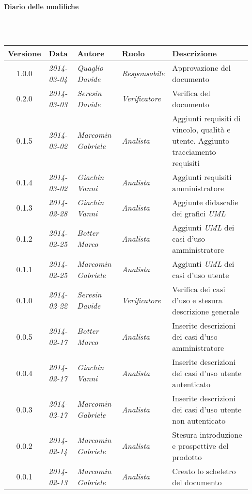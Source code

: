 \noindent\begin{Large}\textbf{Diario delle modifiche}\end{Large}\\
\\
\begin{small}
\begin{tabular}{|c|p{1.8cm}|p{2.8cm}|p{2.8cm}|p{3.5cm}|}
\hline
Versione & Data & Autore & Ruolo & Descrizione \\
\hline
\hline
1.0.0 & \textit{2014-03-04} &
\textit{Quaglio Davide} &
\textit{Responsabile} &  Approvazione del documento\\
\hline
\hline
0.2.0 & \textit{2014-03-03} &
\textit{Seresin Davide} &
\textit{Verificatore} &  Verifica del documento\\
\hline
\hline
0.1.5 & \textit{2014-03-02} &
\textit{Marcomin Gabriele} &
\textit{Analista} &  Aggiunti requisiti di vincolo, qualità e utente. Aggiunto tracciamento requisiti\\
\hline
\hline
0.1.4 & \textit{2014-03-02} &
\textit{Giachin Vanni} &
\textit{Analista} &  Aggiunti requisiti amministratore\\
\hline
\hline
0.1.3 & \textit{2014-02-28} &
\textit{Giachin Vanni} &
\textit{Analista} &  Aggiunte didascalie dei grafici \textit{UML}\\
\hline
\hline
0.1.2 & \textit{2014-02-25} &
\textit{Botter Marco} &
\textit{Analista} &  Aggiunti \textit{UML} dei casi d'uso amministratore\\
\hline
\hline
0.1.1 & \textit{2014-02-25} &
\textit{Marcomin Gabriele} &
\textit{Analista} &  Aggiunti \textit{UML} dei casi d'uso utente\\
\hline
\hline
0.1.0 & \textit{2014-02-22} &
\textit{Seresin Davide} &
\textit{Verificatore} &  Verifica dei casi d'uso e stesura descrizione generale\\
\hline
\hline
0.0.5 & \textit{2014-02-17} &
\textit{Botter Marco} &
\textit{Analista} &  Inserite descrizioni dei casi d'uso amministratore\\
\hline
\hline
0.0.4 & \textit{2014-02-17} &
\textit{Giachin Vanni} &
\textit{Analista} &  Inserite descrizioni dei casi d'uso utente autenticato\\
\hline
\hline
0.0.3 & \textit{2014-02-17} &
\textit{Marcomin Gabriele} &
\textit{Analista} &  Inserite descrizioni dei casi d'uso utente non autenticato\\
\hline
\hline
0.0.2 & \textit{2014-02-14} & 
\textit{Marcomin Gabriele} &
\textit{Analista} &  Stesura introduzione e prospettive del prodotto\\
\hline
\hline
0.0.1 & \textit{2014-02-13} &
\textit{Marcomin Gabriele} &
\textit{Analista} &  Creato lo scheletro del documento\\
\hline
\hline
\end{tabular}\\
\end{small}